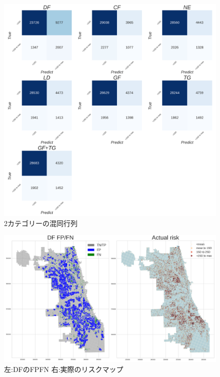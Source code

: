 \begin{figure}
  \centering %
  \includegraphics[scale=0.16]{./non-crime-timeseries-fig/non_crime_no_timeseries_two_cm.png}
  \caption{2カテゴリーの混同行列}
  \label{fig:non-crime-timeseries-2cm}
\end{figure}
\begin{figure}
  \centering %
  \includegraphics[scale=0.25]{./non-crime-timeseries-fig/DF_fnp.png}
  \caption{左:DFのFPFN 右:実際のリスクマップ}
  \label{fig:non-crime-timeseries-df-fnp}
\end{figure}

